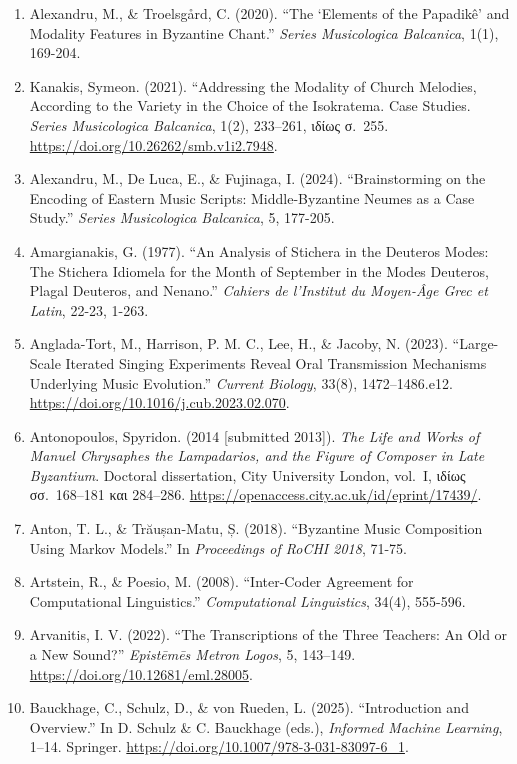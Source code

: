 \documentclass[11pt,a4paper]{article}
\providecommand{\tightlist}{\setlength{\itemsep}{0pt}\setlength{\parskip}{0pt}}
\begin{document}
\begin{enumerate}
\def\labelenumi{\arabic{enumi}.}

\tightlist

\item
 Alexandru, M., \& Troelsgård, C. (2020). ``The `Elements of the Papadikê' and Modality Features in Byzantine Chant.'' \emph{Series Musicologica Balcanica}, 1(1), 169-204.
\item
 Kanakis, Symeon. (2021). ``Addressing the Modality of Church Melodies, According to the Variety in the Choice of the Isokratema. Case Studies. \emph{Series Musicologica Balcanica}, 1(2), 233--261, ιδίως σ.~255. \url{https://doi.org/10.26262/smb.v1i2.7948}.
\item
 Alexandru, M., De Luca, E., \& Fujinaga, I. (2024). ``Brainstorming on the Encoding of Eastern Music Scripts: Middle-Byzantine Neumes as a Case Study.'' \emph{Series Musicologica Balcanica}, 5, 177-205.
\item
 Amargianakis, G. (1977). ``An Analysis of Stichera in the Deuteros Modes: The Stichera Idiomela for the Month of September in the Modes Deuteros, Plagal Deuteros, and Nenano.'' \emph{Cahiers de l'Institut du Moyen-Âge Grec et Latin}, 22-23, 1-263.
\item
 Anglada-Tort, M., Harrison, P. M. C., Lee, H., \& Jacoby, N. (2023). ``Large-Scale Iterated Singing Experiments Reveal Oral Transmission Mechanisms Underlying Music Evolution.'' \emph{Current Biology}, 33(8), 1472--1486.e12. \url{https://doi.org/10.1016/j.cub.2023.02.070}.
\item
 Antonopoulos, Spyridon. (2014 [submitted 2013]). \emph{The Life and Works of Manuel Chrysaphes the Lampadarios, and the Figure of Composer in Late Byzantium}. Doctoral dissertation, City University London, vol.~I, ιδίως σσ.~168--181 και 284--286. \url{https://openaccess.city.ac.uk/id/eprint/17439/}.
\item
 Anton, T. L., \& Trăușan-Matu, Ș. (2018). ``Byzantine Music Composition Using Markov Models.'' In \emph{Proceedings of RoCHI 2018}, 71-75.
\item
 Artstein, R., \& Poesio, M. (2008). ``Inter-Coder Agreement for Computational Linguistics.'' \emph{Computational Linguistics}, 34(4), 555-596.
\item
 Arvanitis, I. V. (2022). ``The Transcriptions of the Three Teachers: An Old or a New Sound?'' \emph{Epistēmēs Metron Logos}, 5, 143--149. \url{https://doi.org/10.12681/eml.28005}.
\item
 Bauckhage, C., Schulz, D., \& von Rueden, L. (2025). ``Introduction and Overview.'' In D. Schulz \& C. Bauckhage (eds.), \emph{Informed Machine Learning}, 1--14. Springer. \url{https://doi.org/10.1007/978-3-031-83097-6_1}.

\end{enumerate}
\end{document}
